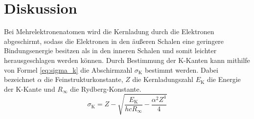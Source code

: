 \section{Diskussion}
\label{sec:Diskussion}
Bei Mehrelektronenatomen wird die Kernladung durch die Elektronen
abgeschirmt, sodass die Elektronen in den äußeren Schalen eine geringere
Bindungsenergie besitzen als in den inneren Schalen und somit leichter
herausgeschlagen werden können. Durch Bestimmung der K-Kanten kann
mithilfe von Formel \eqref{eq:sigma_k} die Abschirmzahl
$\sigma_\mathrm{K}$ bestimmt werden. Dabei bezeichnet $\alpha$ die
Feinstrukturkonstante, $Z$ die Kernladungszahl $E_\text{K}$ die Energie
der K-Kante und $R_\infty$ die Rydberg-Konstante.
%
\begin{equation}
  \sigma_\text{K} = Z - \sqrt{\frac{E_\text{K}}{h c R_\infty}
    - \frac{\alpha^2 Z^4}{4}}
\label{eq:sigma_k}
\end{equation}
% 
